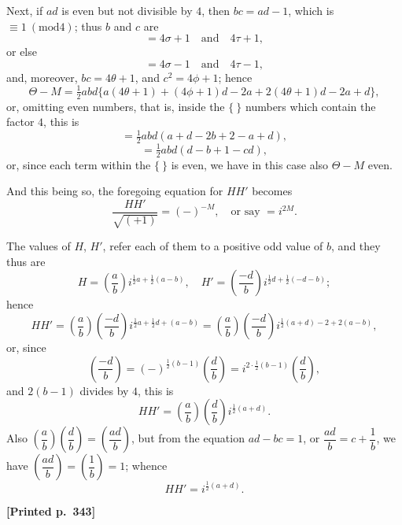 \documentclass[11pt]{article}
\providecommand{\modd}{\mathrm{mod}}
\begin{document}
Next, if $ad$ is even but not divisible by $4$, then $bc = ad - 1$, which is $\equiv 1\ (\modd 4)$; thus $b$ and $c$ are
\[
= 4\sigma + 1\quad\text{and}\quad 4\tau + 1,
\]
or else
\[
= 4\sigma - 1\quad\text{and}\quad 4\tau - 1,
\]
and, moreover, $bc = 4\theta + 1$, and $c^{2} = 4\phi + 1$; hence
\[
\Theta - M = \tfrac{1}{2}abd\bigl\{a(4\theta + 1) + (4\phi + 1)d - 2a + 2(4\theta + 1)d - 2a + d\bigr\},
\]
or, omitting even numbers, that is, inside the $\{\ \}$ numbers which contain the factor $4$, this is
\[
= \tfrac{1}{2}abd(a + d - 2b + 2 - a + d),
\]
\[
= \tfrac{1}{2}abd(d - b + 1 - cd),
\]
or, since each term within the $\{\ \}$ is even, we have in this case also $\Theta - M$ even.

And this being so, the foregoing equation for $HH'$ becomes
\[
\frac{HH'}{\sqrt{(+1)}} = (-)^{-M},\quad\text{or say } = i^{2M}.
\]

The values of $H$, $H'$, refer each of them to a positive odd value of $b$, and they thus are
\[
H = \left(\frac{a}{b}\right) i^{\frac{1}{2}a + \frac{1}{2}(a - b)},\quad H' = \left(\frac{-d}{b}\right) i^{\frac{1}{2}d + \frac{1}{2}(-d - b)};
\]
hence
\[
HH' = \left(\frac{a}{b}\right)\left(\frac{-d}{b}\right) i^{\frac{1}{2}a + \frac{1}{2}d + (a - b)} = \left(\frac{a}{b}\right)\left(\frac{-d}{b}\right) i^{\frac{1}{2}(a + d) - 2 + 2(a - b)},
\]
or, since
\[
\left(\frac{-d}{b}\right) = (-)^{\frac{1}{2}(b - 1)}\left(\frac{d}{b}\right) = i^{2 \cdot \frac{1}{2}(b - 1)}\left(\frac{d}{b}\right),
\]
and $2(b - 1)$ divides by $4$, this is
\[
HH' = \left(\frac{a}{b}\right)\left(\frac{d}{b}\right) i^{\frac{1}{2}(a + d)}.
\]
Also $\left(\dfrac{a}{b}\right)\left(\dfrac{d}{b}\right) = \left(\dfrac{ad}{b}\right)$, but from the equation $ad - bc = 1$, or $\dfrac{ad}{b} = c + \dfrac{1}{b}$, we have $\left(\dfrac{ad}{b}\right) = \left(\dfrac{1}{b}\right) = 1$; whence
\[
HH' = i^{\frac{1}{2}(a + d)}.
\]

\medskip

\noindent\textbf{[Printed p.~343]}\hfill
\end{document}
